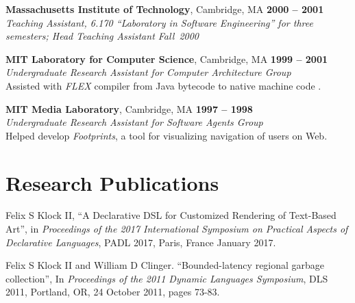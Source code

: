 \documentclass[margin,line,draft]{res}
\def\noneed#1{}
\def\coursetitle#1{\textsl{#1}}
\newcommand{\mysidestyle}{\sc}
\begin{document}
\begin{resume}
    \textbf{Massachusetts Institute of Technology}, Cambridge, MA \hfill \textbf{2000 -- 2001} \\\vspace{1mm}%
    \textsl{Teaching Assistant, 6.170 \coursetitle{``Laboratory in Software Engineering''} for three semesters; Head Teaching Assistant Fall~2000}
    \noneed{Assistant for 6.170, \noneed{\coursetitle{Laboratory in Software Engineering},}
    Spring, Fall~2000, Spring~2001. {Head Teaching Assistant Fall~2000.}}

    \textbf{MIT Laboratory for Computer Science}, Cambridge, MA  \hfill \textbf{1999 -- 2001}\\\vspace{1mm}%
    \textsl{Undergraduate Research Assistant for Computer Architecture Group}\\
    Assisted with \emph{FLEX} compiler {from
    Java bytecode to native machine code}%
    .

    \textbf{MIT Media Laboratory}, Cambridge, MA \hfill \textbf{1997 -- 1998}\\\vspace{1mm}%
    \textsl{Undergraduate Research Assistant for Software Agents Group} \\
    Helped develop \emph{Footprints}, a tool for visualizing navigation of 
    users on Web.


    \section{\mysidestyle Research Publications}

    Felix S Klock II, ``A Declarative DSL for Customized Rendering of Text-Based Art'', in \textsl{Proceedings of the 2017 International Symposium on Practical Aspects of Declarative Languages}, PADL 2017, Paris, France January 2017.

    Felix S Klock II and William D Clinger.  ``Bounded-latency regional garbage collection'', In \textsl{Proceedings of the 2011 Dynamic Languages Symposium}, DLS 2011, Portland, OR, 24 October 2011, pages 73-83.


\end{resume}
\end{document}
